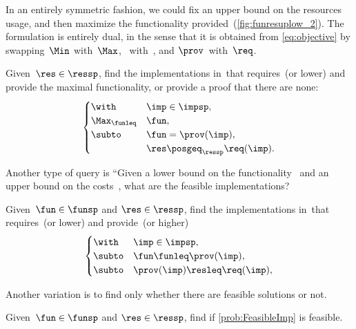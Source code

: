 In an entirely symmetric fashion, we could fix an upper bound on
the resources usage, and then maximize the functionality provided~(\cref{fig:funresuplow_2}).
The formulation is entirely dual, in the sense that it is obtained
from \cref{eq:objective} by swapping~$\Min$ with~$\Max$, \funsp~with~\ressp,
and $\prov$~with~$\req$.

\begin{problem}[\FixResMinFun]
  \label{prob:FixResMinFun}
  Given~$\res\in\ressp$, find the implementations
  in~\impsp that requires~\res (or lower)
  and provide the maximal functionality, or provide a proof that there are none:
  \begin{equation}
    \begin{cases}
      \with & \imp\in\impsp,\\
      \Max_{\funleq} & \fun,\\
      \subto & \fun=\prov(\imp),\\
      & \res\posgeq_{\ressp}\req(\imp).
    \end{cases}\label{eq:objective-1}
  \end{equation}
\end{problem}


\vspace{1cm}


Another type of query is
``Given a lower bound on the functionality~\fun
and an upper bound on the costs~\fun, what are the feasible implementations?


\begin{problem}[\FeasibleImp]
  \label{prob:FeasibleImp}
  Given~$\fun\in\funsp$ and $\res\in\ressp$, find the implementations
  in~\impsp that requires~\res (or lower)
  and provide~\fun (or higher)
  \begin{equation}
    \begin{cases}
      \with & \imp\in\impsp,\\
      \subto & \fun \funleq \prov(\imp),\\
      \subto &  \prov(\imp) \resleq \req(\imp) ,\\
    \end{cases}
  \end{equation}
\end{problem}

Another variation is to find only whether there are feasible solutions or not.

\begin{problem}[\Feasibility]
  \label{prob:Feasibility}
  Given~$\fun\in\funsp$ and $\res\in\ressp$, find if \cref{prob:FeasibleImp} is feasible.
\end{problem}
